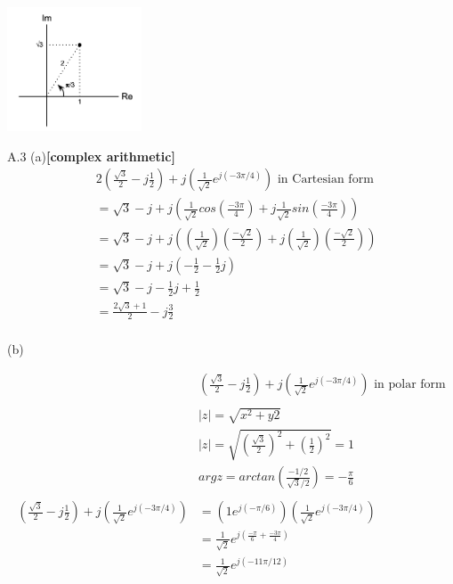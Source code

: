 \documentclass{article}
\begin{document}
\begin{center}
    \includegraphics[width=0.3\textwidth]{a2d.png}
\end{center}

A.3 (a){\bf [complex arithmetic]}\\

\begin{equation*}
\begin{split}
    & 2(\frac{\sqrt{3}}{2}-j\frac{1}{2})+j(\frac{1}{\sqrt{2}}e^{j(-3\pi/4)}) \text{ in Cartesian form}\\
    & = \sqrt{3} - j + j (\frac{1}{\sqrt{2}}cos(\frac{-3\pi}{4}) + j \frac{1}{\sqrt{2}} sin(\frac{-3\pi}{4}))\\
    & = \sqrt{3} - j + j((\frac{1}{\sqrt{2}})(\frac{-\sqrt{2}}{2}) + j(\frac{1}{\sqrt{2}})(\frac{-\sqrt{2}}{2}))\\
    & = \sqrt{3} - j + j(-\frac{1}{2} - \frac{1}{2}j)\\
    & = \sqrt{3} - j - \frac{1}{2}j + \frac{1}{2}\\
    & = \frac{2 \sqrt{3} + 1}{2} - j\frac{3}{2}\\
\end{split}
\end{equation*} 

(b)

\begin{equation*}
\begin{split}
    & (\frac{\sqrt{3}}{2}-j\frac{1}{2}) + j(\frac{1}{\sqrt{2}}e^{j(-3\pi/4)}) \text{ in polar form}\\\\
    & |z| = \sqrt{x^2+y2}\\ 
    & |z| = \sqrt{(\frac{\sqrt{3}}{2})^2+(\frac{1}{2})^2} = 1\\
    & argz = arctan(\frac{-1/2}{\sqrt{3}/2}) = -\frac{\pi}{6}\\\\
    (\frac{\sqrt{3}}{2}-j\frac{1}{2}) + j(\frac{1}{\sqrt{2}}e^{j(-3\pi/4)}) &= (1e^{j(-\pi/6)}) (\frac{1}{\sqrt{2}}e^{j(-3\pi/4)})\\
    &= \frac{1}{\sqrt{2}} e^{j(\frac{-\pi}{6} + \frac{-3\pi}{4})}\\
    &= \frac{1}{\sqrt{2}}e^{j(-11\pi/12)}
\end{split}
\end{equation*} 
\end{document}
